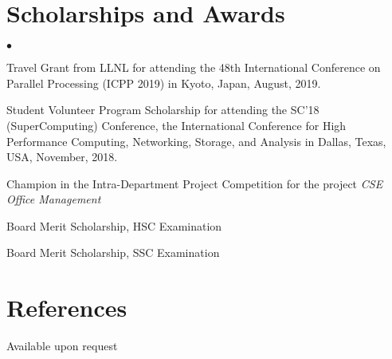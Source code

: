 \documentclass[margin,line]{res}
\newenvironment{list2}{
  \begin{list}{$\bullet$}{%
      \setlength{\itemsep}{0in}
      \setlength{\parsep}{0in} \setlength{\parskip}{0in}
      \setlength{\topsep}{0in} \setlength{\partopsep}{0in} 
      \setlength{\leftmargin}{0.2in}}}{\end{list}}
\begin{document}
\begin{resume}
\section{\sc Scholarships and Awards}
\begin{list2}
\item Travel Grant from LLNL for attending the 48th International Conference on Parallel Processing (ICPP 2019) in Kyoto, Japan, August, 2019.
\item Student Volunteer Program Scholarship for attending the SC'18 (SuperComputing) Conference, the International Conference for High Performance Computing, Networking, Storage, and Analysis in Dallas, Texas, USA, November, 2018.
\item Champion in the Intra-Department Project Competition for the project \textit{CSE Office Management}
\item Board Merit Scholarship, HSC Examination
\item Board Merit Scholarship, SSC Examination
\end{list2}

\vspace*{-.1in}

\section{\sc References} 
Available upon request

\end{resume}
\end{document}
